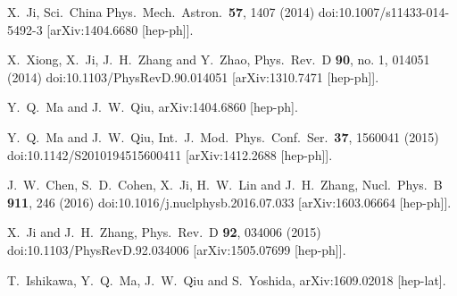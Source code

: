 \documentclass[english,preprint,aps,prd,showpacs,superscriptaddress,nofootinbib,tightenlines]{revtex4}
\begin{document}
\begin{thebibliography}{99}
  X.~Ji,
  Sci.\ China Phys.\ Mech.\ Astron.\  {\bf 57}, 1407 (2014)
  doi:10.1007/s11433-014-5492-3
  [arXiv:1404.6680 [hep-ph]].


  X.~Xiong, X.~Ji, J.~H.~Zhang and Y.~Zhao,
  Phys.\ Rev.\ D {\bf 90}, no. 1, 014051 (2014)
  doi:10.1103/PhysRevD.90.014051
  [arXiv:1310.7471 [hep-ph]].


  Y.~Q.~Ma and J.~W.~Qiu,
  arXiv:1404.6860 [hep-ph].


  Y.~Q.~Ma and J.~W.~Qiu,
  Int.\ J.\ Mod.\ Phys.\ Conf.\ Ser.\  {\bf 37}, 1560041 (2015)
  doi:10.1142/S2010194515600411
  [arXiv:1412.2688 [hep-ph]].


  J.~W.~Chen, S.~D.~Cohen, X.~Ji, H.~W.~Lin and J.~H.~Zhang,
  Nucl.\ Phys.\ B {\bf 911}, 246 (2016)
  doi:10.1016/j.nuclphysb.2016.07.033
  [arXiv:1603.06664 [hep-ph]].


  X.~Ji and J.~H.~Zhang,
  Phys.\ Rev.\ D {\bf 92}, 034006 (2015)
  doi:10.1103/PhysRevD.92.034006
  [arXiv:1505.07699 [hep-ph]].


  T.~Ishikawa, Y.~Q.~Ma, J.~W.~Qiu and S.~Yoshida,
  arXiv:1609.02018 [hep-lat].



\end{thebibliography}
\end{document}
